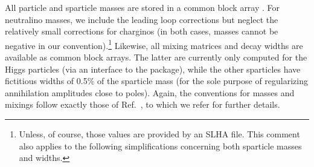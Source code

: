  All particle and sparticle masses are stored in a common block array . For 
 neutralino masses, we include the leading loop corrections \cite{Drees:1996pk,
 Pierce:1993gj,Lahanas:1993ib}
 but neglect the relatively small corrections for charginos \cite{Drees:1996pk} 
 (in both cases, masses cannot be negative in our convention).\footnote{
 Unless, of course, those values are provided by an SLHA file. This comment also applies to the following 
 simplifications concerning both sparticle masses and widths.
 }
 Likewise, all mixing matrices and decay widths are available as common block arrays. 
 The latter are currently only computed for the Higgs particles (via an interface to the
  \cite{Heinemeyer:1998yj,feynhiggs_www,Heinemeyer:1998jw,
 Heinemeyer:1998np,Heinemeyer:1999be} package),
 while the other sparticles have fictitious widths of 0.5\% of the sparticle mass (for the 
 sole purpose of regularizing annihilation amplitudes close to poles). Again, the 
 conventions for masses and mixings follow exactly those of Ref.~\cite{ds4}, to which we 
 refer for further details.